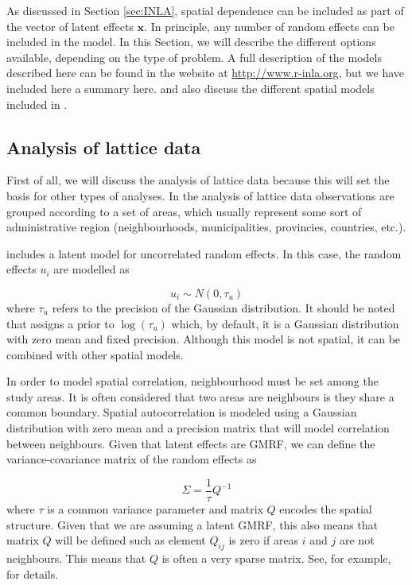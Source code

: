 \documentclass[article]{jss}
\begin{document}
As discussed in Section \ref{sec:INLA}, spatial dependence can be included as
part of the vector of latent effects $\mathbf{x}$. In principle, any number of
random effects can be included in the model. In this Section, we will describe
the different options available, depending on the type of problem. A full
description of the models described here can be found in the 
website at \url{http://www.r-inla.org}, but we have included here a summary
here. \citet{Blangiardoetal:2013} and \citet{GomezRubioetal:2013} also discuss
the different spatial models included in .

\subsection{Analysis of lattice data}

First of all, we will discuss the analysis of lattice data because this will
set the basis for other types of analyses. In the analysis of lattice data
observations are grouped according to a set of areas, which usually represent
some sort of administrative region (neighbourhoods, municipalities, provincies,
countries, etc.).

 includes a latent model for uncorrelated random effects. In
this case, the random effects $u_i$ are modelled as

\begin{equation}
u_i \sim N(0, \tau_u)
\end{equation}
\noindent
where $\tau_u$ refers to the precision of the Gaussian distribution.  It should
be noted that  assigns a prior to $\log(\tau_u)$ which, by default,
it is a Gaussian distribution with zero mean and fixed precision.  Although
this model is not spatial, it can be combined with other spatial models.


In order to model spatial correlation, neighbourhood must be set among the
study areas.  It is often considered that two areas are neighbours is they
share a common boundary.  Spatial autocorrelation is modeled using a Gaussian
distribution with zero mean and a precision matrix that will model
correlation between neighbours. Given that latent effects are GMRF, 
we can define the variance-covariance matrix of the random effects
as

$$
\Sigma = \frac{1}{\tau} Q^{-1}
$$
\noindent
where $\tau$ is a common variance parameter and matrix $Q$ encodes
the spatial structure. Given that we are assuming a latent GMRF, this also
means that matrix $Q$ will be defined such as element $Q_{ij}$ is zero if
areas $i$ and $j$ are not neighbours. This means that $Q$ is often a very
sparse matrix. See, for example, \citet{rueheld:2005} 
for details.
\end{document}
